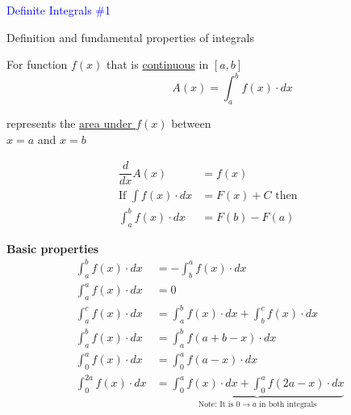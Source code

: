 \documentclass[14pt,fleqn]{extarticle}
\begin{document}
\begin{skill}
    \begin{narrow}
\textcolor{blue}{Definite Integrals \#1}

Definition and fundamental properties of integrals 
         
    \end{narrow}
    
    \reason 

For function $f(x)$ that is \underline{continuous} in $\left[a,b \right]$
\[ \qquad \qquad A(x) = \int_a^b f(x)\cdot dx \]

represents the \underline{area under $f(x)$} between \\$x=a$ and $x=b$

\begin{align}
	\dfrac{d}{dx} A(x) &= f(x) \\ 
	\text{If } \int f(x)\cdot dx &= F(x) + C \text{ then } \\
	\int_a^b f(x)\cdot dx &= F(b) - F(a) 
\end{align}

\textbf{Basic properties} 
\smallmath
\begin{align}
	\int_a^b f(x)\cdot dx &= -\int_b^a f(x)\cdot dx \\
	\int_a^a f(x)\cdot dx &= 0 \\
	\int_a^c f(x)\cdot dx &= \int_a^b f(x)\cdot dx + \int_b^c f(x)\cdot dx \\
	\int_a^b f(x)\cdot dx &= \int_a^b f \left(a+b-x \right)\cdot dx \\
	\int_0^a f(x)\cdot dx &= \int_0^a f \left(a-x \right)\cdot dx \\
	\int_0^{2a} f(x)\cdot dx &= \underbrace{\int_0^a f(x)\cdot dx + \int_0^a f \left(2a-x \right)\cdot dx}_{\text{Note: It is $0\rightarrow a$ in both integrals}}
\end{align}
    
    
\end{skill}
\end{document}
